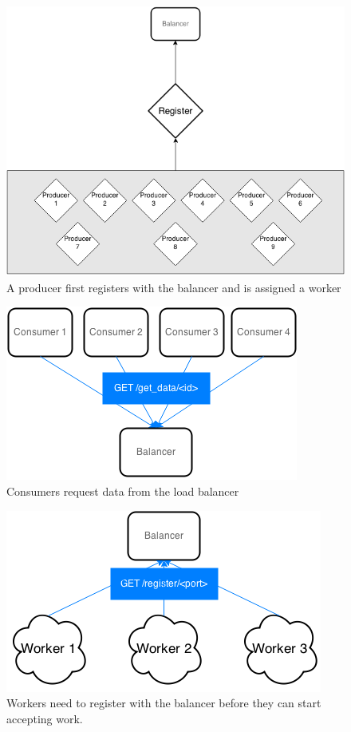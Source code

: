 \documentclass{sigchi}
\begin{document}
\begin{figure}[!h]
\centering
\includegraphics[width=0.9\columnwidth]{img/producer}
\caption{A producer first registers with the balancer and is assigned a worker}
\label{fig:producer}
\end{figure}

\begin{figure}[!h]
\centering
\includegraphics[width=0.9\columnwidth]{img/consumer_req}
\caption{Consumers request data from the load balancer}
\label{fig:consumer_req}
\end{figure}

\begin{figure}[!h]
\centering
\includegraphics[width=0.9\columnwidth]{img/workerreg}
\caption{Workers need to register with the balancer before they can start accepting work.}
\label{fig:worker}
\end{figure}
\end{document}
